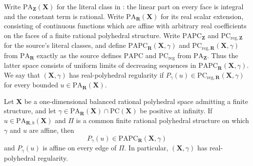 
Write $\mathrm{PA}_{\mathbf Z}(\mathbf X)$ for the literal class in
\cite[Definition~2.28]{BMPS26}: the linear part on every face is integral and
the constant term is rational.  Write
$\mathrm{PA}_{\mathbf R}(\mathbf X)$ for its real scalar extension, consisting
of continuous functions which are affine with arbitrary real coefficients on
the faces of a finite rational polyhedral structure.  Write
$\mathrm{PAPC}_{\mathbf Z}$ and
$\mathrm{PC}_{\mathrm{reg},\mathbf Z}$ for the source's literal classes, and
define
$\mathrm{PAPC}_{\mathbf R}(\mathbf X,\gamma)$ and
$\mathrm{PC}_{\mathrm{reg},\mathbf R}(\mathbf X,\gamma)$ from
$\mathrm{PA}_{\mathbf R}$ exactly as the source defines $\mathrm{PAPC}$ and
$\mathrm{PC}_{\mathrm{reg}}$ from $\mathrm{PA}_{\mathbf Z}$.  Thus the latter
space consists of uniform limits of decreasing sequences in
$\mathrm{PAPC}_{\mathbf R}(\mathbf X,\gamma)$.  We say that
$(\mathbf X,\gamma)$ has real-polyhedral regularity if
$P_\gamma(u)\in\mathrm{PC}_{\mathrm{reg},\mathbf R}(\mathbf X,\gamma)$ for
every bounded $u\in\mathrm{PA}_{\mathbf R}(\mathbf X)$.

\begin{theorem}
\label{thm:frontier-polyhedral-one-dimensional-real-regularity}
Let $\mathbf X$ be a one-dimensional balanced rational polyhedral space
admitting a finite structure, and let
$\gamma\in\mathrm{PA}_{\mathbf R}(\mathbf X)\cap
\mathrm{PC}(\mathbf X)$ be positive at infinity.  If
$u\in\mathrm{PA}_{\mathbf R,b}(\mathbf X)$ and $\Pi$ is a common finite
rational polyhedral structure on which $\gamma$ and $u$ are affine, then
\[
 P_\gamma(u)\in
 \mathrm{PAPC}_{\mathbf R}(\mathbf X,\gamma)
\]
and $P_\gamma(u)$ is affine on every edge of $\Pi$.  In particular,
$(\mathbf X,\gamma)$ has real-polyhedral regularity.
\end{theorem}

